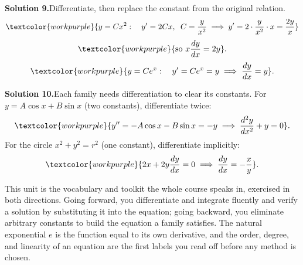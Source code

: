 \medskip
\noindent\textbf{Solution 9.}\quad Differentiate, then replace the constant from
the original relation.
\[ \textcolor{workpurple}{y = Cx^{2}: \quad y' = 2Cx, \;\; C = \frac{y}{x^{2}} \;\Longrightarrow\; y' = 2\cdot\frac{y}{x^{2}}\cdot x = \frac{2y}{x}} \]
\[ \textcolor{workpurple}{\text{so } x\frac{dy}{dx} = 2y}. \]
\[ \textcolor{workpurple}{y = Ce^{x}: \quad y' = Ce^{x} = y \;\Longrightarrow\; \frac{dy}{dx} = y}. \]

\medskip
\noindent\textbf{Solution 10.}\quad Each family needs differentiation to clear
its constants. For $y = A\cos x + B\sin x$ (two constants), differentiate twice:
\[ \textcolor{workpurple}{y'' = -A\cos x - B\sin x = -y \;\Longrightarrow\; \frac{d^{2}y}{dx^{2}} + y = 0}. \]
For the circle $x^{2} + y^{2} = r^{2}$ (one constant), differentiate implicitly:
\[ \textcolor{workpurple}{2x + 2y\frac{dy}{dx} = 0 \;\Longrightarrow\; \frac{dy}{dx} = -\frac{x}{y}}. \]

\vspace{0.8em}
\begin{conceptbox}
This unit is the vocabulary and toolkit the whole course speaks in, exercised in
both directions. Going forward, you \textcolor{accentorange}{differentiate and
integrate} fluently and \textcolor{accentorange}{verify a solution} by
substituting it into the equation; going backward, you
\textcolor{accentorange}{eliminate arbitrary constants} to build the equation a
family satisfies. The \textcolor{accentorange}{natural exponential $e$} is the
function equal to its own derivative, and the
\textcolor{accentorange}{order, degree, and linearity} of an equation are the
first labels you read off before any method is chosen.
\end{conceptbox}


